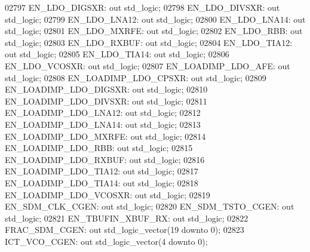 \begin{DoxyCode}
02797     EN\_LDO\_DIGSXR:  \textcolor{keywordflow}{out} \textcolor{comment}{std\_logic};
02798     EN\_LDO\_DIVSXR:  \textcolor{keywordflow}{out} \textcolor{comment}{std\_logic};
02799     EN\_LDO\_LNA12:   \textcolor{keywordflow}{out} \textcolor{comment}{std\_logic};
02800     EN\_LDO\_LNA14:   \textcolor{keywordflow}{out} \textcolor{comment}{std\_logic};
02801     EN\_LDO\_MXRFE:   \textcolor{keywordflow}{out} \textcolor{comment}{std\_logic};
02802     EN\_LDO\_RBB: \textcolor{keywordflow}{out} \textcolor{comment}{std\_logic};
02803     EN\_LDO\_RXBUF:   \textcolor{keywordflow}{out} \textcolor{comment}{std\_logic};
02804     EN\_LDO\_TIA12:   \textcolor{keywordflow}{out} \textcolor{comment}{std\_logic};
02805     EN\_LDO\_TIA14:   \textcolor{keywordflow}{out} \textcolor{comment}{std\_logic};
02806     EN\_LDO\_VCOSXR:  \textcolor{keywordflow}{out} \textcolor{comment}{std\_logic};
02807     EN\_LOADIMP\_LDO\_AFE: \textcolor{keywordflow}{out} \textcolor{comment}{std\_logic};
02808     EN\_LOADIMP\_LDO\_CPSXR:   \textcolor{keywordflow}{out} \textcolor{comment}{std\_logic};
02809     EN\_LOADIMP\_LDO\_DIGSXR:  \textcolor{keywordflow}{out} \textcolor{comment}{std\_logic};
02810     EN\_LOADIMP\_LDO\_DIVSXR:  \textcolor{keywordflow}{out} \textcolor{comment}{std\_logic};
02811     EN\_LOADIMP\_LDO\_LNA12:   \textcolor{keywordflow}{out} \textcolor{comment}{std\_logic};
02812     EN\_LOADIMP\_LDO\_LNA14:   \textcolor{keywordflow}{out} \textcolor{comment}{std\_logic};
02813     EN\_LOADIMP\_LDO\_MXRFE:   \textcolor{keywordflow}{out} \textcolor{comment}{std\_logic};
02814     EN\_LOADIMP\_LDO\_RBB: \textcolor{keywordflow}{out} \textcolor{comment}{std\_logic};
02815     EN\_LOADIMP\_LDO\_RXBUF:   \textcolor{keywordflow}{out} \textcolor{comment}{std\_logic};
02816     EN\_LOADIMP\_LDO\_TIA12:   \textcolor{keywordflow}{out} \textcolor{comment}{std\_logic};
02817     EN\_LOADIMP\_LDO\_TIA14:   \textcolor{keywordflow}{out} \textcolor{comment}{std\_logic};
02818     EN\_LOADIMP\_LDO\_VCOSXR:  \textcolor{keywordflow}{out} \textcolor{comment}{std\_logic};
02819     EN\_SDM\_CLK\_CGEN:    \textcolor{keywordflow}{out} \textcolor{comment}{std\_logic};
02820     EN\_SDM\_TSTO\_CGEN:   \textcolor{keywordflow}{out} \textcolor{comment}{std\_logic};
02821     EN\_TBUFIN\_XBUF\_RX:  \textcolor{keywordflow}{out} \textcolor{comment}{std\_logic};
02822     FRAC\_SDM\_CGEN:  \textcolor{keywordflow}{out} \textcolor{comment}{std\_logic\_vector}(\textcolor{vhdllogic}{}\textcolor{vhdllogic}{19} \textcolor{keywordflow}{downto} \textcolor{vhdllogic}{}\textcolor{vhdllogic}{0});
02823     ICT\_VCO\_CGEN:   \textcolor{keywordflow}{out} \textcolor{comment}{std\_logic\_vector}(\textcolor{vhdllogic}{}\textcolor{vhdllogic}{4} \textcolor{keywordflow}{downto} \textcolor{vhdllogic}{}\textcolor{vhdllogic}{0});

\end{DoxyCode}
